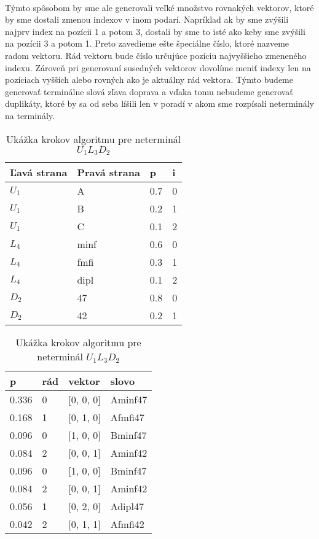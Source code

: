 \paragraph{}
Týmto spôsobom by sme ale generovali veľké množstvo rovnakých vektorov, ktoré by sme dostali zmenou indexov v inom podarí. Napríklad ak by sme zvýšili najprv index na pozícii 1 a potom 3, dostali by sme to isté ako keby sme zvýšili na pozícii 3 a potom 1. Preto zavedieme ešte špeciálne číslo, ktoré nazveme radom vektoru. Rád vektoru bude číslo určujúce pozíciu najvyššieho zmeneného indexu. Zároveň pri generovaní susedných vektorov dovolíme meniť indexy len na pozíciach vyšších alebo rovných ako je aktuálny rád vektora. Týmto budeme generovať terminálne slová zľava doprava a vďaka tomu nebudeme generovať duplikáty, ktoré by sa od seba líšili len v poradí v akom sme rozpísali neterminály na terminály.

\begin{table}[]
\centering
\caption{Ukážka krokov algoritmu pre neterminál \(U_1L_3D_2\)}
\label{postupAlgoritmu}
\begin{tabular}{l|lll}
Ľavá strana & Pravá strana & p & i \\ \hline
\(U_1\) & A & 0.7 & 0 \\
\(U_1\) & B & 0.2 & 1 \\
\(U_1\) & C & 0.1 & 2 \\
\(L_4\) & minf & 0.6 & 0 \\
\(L_4\) & fmfi & 0.3 & 1 \\
\(L_4\) & dipl & 0.1 & 2 \\
\(D_2\) & 47 & 0.8 & 0 \\
\(D_2\) & 42 & 0.2 & 1 \\
\end{tabular}
\quad
\begin{tabular}{llll}
p & rád & vektor & slovo \\ \hline
0.336 & 0 & [0, 0, 0] & Aminf47 \\ \hline \hline
0.168 & 1 & [0, 1, 0] & Afmfi47 \\
0.096 & 0 & [1, 0, 0] & Bminf47 \\
0.084 & 2 & [0, 0, 1] & Aminf42 \\ \hline \hline
0.096 & 0 & [1, 0, 0] & Bminf47 \\
0.084 & 2 & [0, 0, 1] & Aminf42 \\
0.056 & 1 & [0, 2, 0] & Adipl47 \\
0.042 & 2 & [0, 1, 1] & Afmfi42
\end{tabular}
\end{table}

